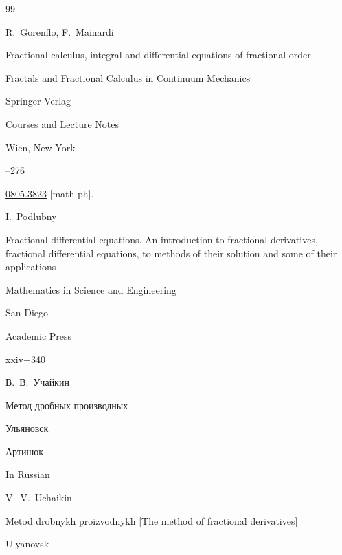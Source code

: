 \begin{thebibliography}{99}

\by R.~Gorenflo, F.~Mainardi

\paper Fractional calculus, integral and  differential equations of fractional order

\inbook Fractals and Fractional Calculus in Continuum Mechanics

\publ Springer Verlag

\serial Courses and Lecture Notes


\publaddr Wien, New York


--276


\arxiv \href{http://arxiv.org/abs/0805.3823}{0805.3823} [math-ph].




\by I.~Podlubny

\book Fractional differential equations. An introduction to fractional derivatives, fractional differential equations, to methods of their solution and some of their applications

\serial Mathematics in Science and Engineering


\publaddr  San Diego

\publ Academic Press


\totalpages xxiv+340 





\by В.~В.~Учайкин

\book Метод дробных производных

\publaddr Ульяновск

\publ Артишок



\misctransl

\lang In Russian

\by  V.~V.~Uchaikin  


\book  Metod drobnykh proizvodnykh \rm [The method of fractional derivatives]

\publaddr Ulyanovsk


\end{thebibliography}
